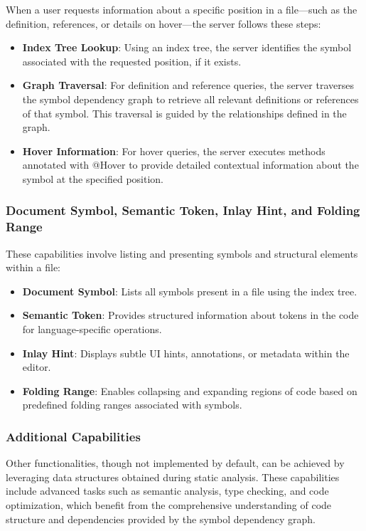 When a user requests information about a specific position in a file—such as the definition, references, or details on hover—the server follows these steps:

\begin{itemize}
    \item \textbf{Index Tree Lookup}: Using an index tree, the server identifies the symbol associated with the requested position, if it exists.
    \item \textbf{Graph Traversal}: For definition and reference queries, the server traverses the symbol dependency graph to retrieve all relevant definitions or references of that symbol. This traversal is guided by the relationships defined in the graph.
    \item \textbf{Hover Information}: For hover queries, the server executes methods annotated with @Hover to provide detailed contextual information about the symbol at the specified position.
\end{itemize}

\subsubsection{Document Symbol, Semantic Token, Inlay Hint, and Folding Range}\label{subsubsec:concept:DocumentSymbolSemanticTokenInlayHintAndFoldingRange}

These capabilities involve listing and presenting symbols and structural elements within a file:

\begin{itemize}
    \item \textbf{Document Symbol}: Lists all symbols present in a file using the index tree.
    \item \textbf{Semantic Token}: Provides structured information about tokens in the code for language-specific operations.
    \item \textbf{Inlay Hint}: Displays subtle UI hints, annotations, or metadata within the editor.
    \item \textbf{Folding Range}: Enables collapsing and expanding regions of code based on predefined folding ranges associated with symbols.
\end{itemize}

\subsubsection{Additional Capabilities}\label{subsubsec:concept:AdditionalCapabilities}
Other functionalities, though not implemented by default, can be achieved by leveraging data structures obtained during static analysis. These capabilities include advanced tasks such as semantic analysis, type checking, and code optimization, which benefit from the comprehensive understanding of code structure and dependencies provided by the symbol dependency graph.

